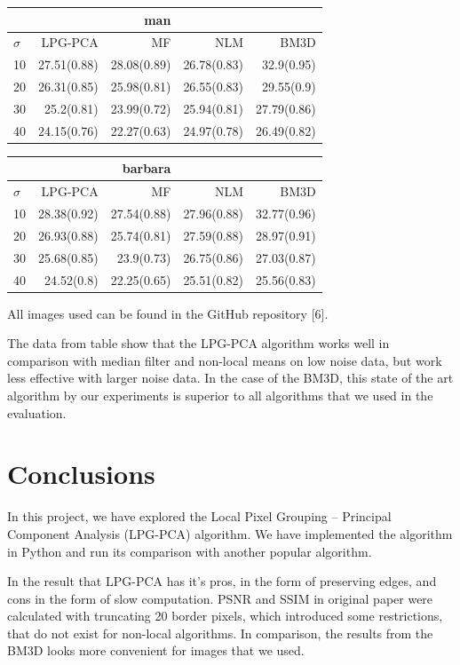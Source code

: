 {\begin{minipage}{.5\linewidth}
\begin{tabular}{lrrrr}
\toprule &&man\\ \midrule
$\sigma$&LPG-PCA&MF&NLM&BM3D\\
\midrule
10&27.51(0.88)&28.08(0.89)&26.78(0.83)&32.9(0.95)\\
20&26.31(0.85)&25.98(0.81)&26.55(0.83)&29.55(0.9)\\
30&25.2(0.81)&23.99(0.72)&25.94(0.81)&27.79(0.86)\\
40&24.15(0.76)&22.27(0.63)&24.97(0.78)&26.49(0.82)\\
\bottomrule
\end{tabular}
\end{minipage}
\noindent\begin{minipage}{.5\linewidth}
\begin{tabular}{lrrrr}
\toprule &&barbara\\ \midrule
$\sigma$&LPG-PCA&MF&NLM&BM3D\\
\midrule
10&28.38(0.92)&27.54(0.88)&27.96(0.88)&32.77(0.96)\\
20&26.93(0.88)&25.74(0.81)&27.59(0.88)&28.97(0.91)\\
30&25.68(0.85)&23.9(0.73)&26.75(0.86)&27.03(0.87)\\
40&24.52(0.8)&22.25(0.65)&25.51(0.82)&25.56(0.83)\\
\bottomrule
\end{tabular}
\end{minipage}
}

All images used can be found in the GitHub repository [6].

The data from table show that the LPG-PCA algorithm works well in comparison with median filter and non-local means on low noise data, but work less effective with larger noise data. In the case of the BM3D, this state of the art algorithm by our experiments is superior to all algorithms that we used in the evaluation.

\section{Conclusions}
In this project, we have explored the Local Pixel Grouping – Principal Component Analysis (LPG-PCA) algorithm. We have implemented the algorithm in Python and run its comparison with another popular algorithm. 

In the result that LPG-PCA has it's pros, in the form of preserving edges, and cons in the form of slow computation. PSNR and SSIM in original paper were calculated with truncating 20 border pixels, which introduced some restrictions, that do not exist for non-local algorithms. In comparison, the results from the BM3D looks more convenient for images that we used.

